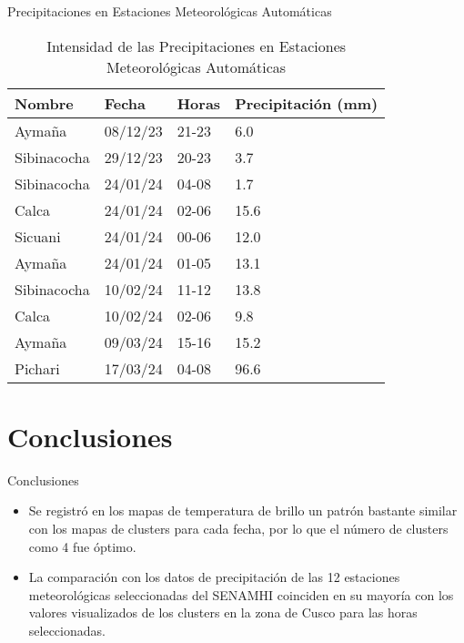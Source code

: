 \documentclass[aspectratio=169,xcolor=dvipsnames]{beamer}
\begin{document}
\begin{frame}{Precipitaciones en Estaciones Meteorológicas Automáticas}
    \centering
    \begin{table}
        \small
        \centering        
        \begin{tabular}{l l l l}
            \toprule
            \textbf{Nombre} & \textbf{Fecha} & \textbf{Horas} & \textbf{Precipitación (mm)} \\
            \midrule
            Aymaña & 08/12/23 & 21-23 & 6.0 \\
            Sibinacocha & 29/12/23 & 20-23 & 3.7 \\
            Sibinacocha & 24/01/24 & 04-08 & 1.7 \\
            Calca & 24/01/24 & 02-06 & 15.6 \\
            Sicuani & 24/01/24 & 00-06 & 12.0 \\
            Aymaña & 24/01/24 & 01-05 & 13.1 \\
            Sibinacocha & 10/02/24 & 11-12 & 13.8 \\
            Calca & 10/02/24 & 02-06 & 9.8 \\        
            Aymaña & 09/03/24 & 15-16 & 15.2 \\
            Pichari & 17/03/24 & 04-08 & 96.6 \\       
            \bottomrule
        \end{tabular}
        \caption{Intensidad de las Precipitaciones en Estaciones Meteorológicas Automáticas}
    \end{table}
\end{frame}
\section{Conclusiones}
\begin{frame}{Conclusiones}
    \begin{itemize}
      \item  Se registró en los mapas de temperatura de brillo un patrón bastante similar con los mapas de clusters para cada fecha, por lo que el número de clusters como 4 fue óptimo.
      \item  La comparación con los datos de precipitación de las 12 estaciones meteorológicas seleccionadas del SENAMHI coinciden en su mayoría con los valores visualizados de los clusters en la zona de Cusco para las horas seleccionadas.
      
    \end{itemize}
\end{frame}
\end{document}
